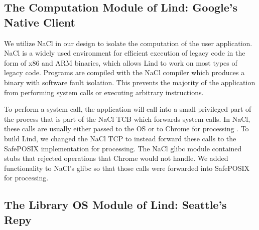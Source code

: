 \subsection{The Computation Module of Lind: Google's Native Client}

We utilize NaCl in our design to isolate the computation of the user application.  
NaCl is a widely used environment for efficient  execution of legacy code in the form of x86 and ARM binaries, 
which allows Lind to work on most types of legacy code. Programs are compiled with the NaCl compiler 
which produces a binary with software fault isolation. This prevents the majority of the application from performing system calls 
or executing arbitrary instructions. 

To perform a system call, the application will call into a small privileged
part of the process that is part of the NaCl TCB which forwards system calls.
 In NaCl, these calls are usually either passed to the OS or to Chrome for 
processing .  To build Lind, we changed the NaCl TCP to 
instead forward these calls to the SafePOSIX implementation
for processing.  The NaCl glibc module contained stubs that rejected operations
that Chrome would not handle.  We added functionality to NaCl's glibc so that
those calls were forwarded into SafePOSIX for processing.


%

\subsection{The Library OS Module of Lind: Seattle's Repy}

